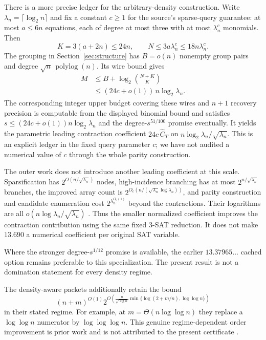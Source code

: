 There is a more precise ledger for the arbitrary-density construction.
Write $\lambda_n=\lceil\log_2n\rceil$ and fix a constant $c\ge1$ for the
source's sparse-query guarantee: at most $a\le6n$ equations, each of
degree at most three with at most $\lambda_n^c$ monomials. Then
\[
 K=3(a+2n)\le24n,\qquad N\le3a\lambda_n^c\le18n\lambda_n^c.
\]
The grouping in Section~\ref{sec:structure} has $B=o(n)$ nonempty group
pairs and degree $\sqrt n\,\operatorname{polylog}(n)$. Its wire bound gives
\begin{align*}
 M&\le B+\log_2\binom{N+K}{K}\\
  &\le (24c+o(1))\,n\log_2\lambda_n.
\end{align*}
The corresponding integer upper budget covering these wires and $n+1$
recovery precision is computable from the displayed binomial bound and
satisfies $s\le(24c+o(1))n\log_2\lambda_n$ and the degree-$s^{51/100}$
promise eventually. It yields the parametric leading contraction
coefficient $24c\,\widehat C_T$ on
$n\log_2\lambda_n/\sqrt{\lambda_n}$.
This is an explicit ledger in the fixed query parameter $c$; we have not
audited a numerical value of $c$ through the whole parity construction.

The outer work does not introduce another leading coefficient at this
scale. Sparsification has $2^{O(n/\sqrt{\lambda_n})}$ nodes,
high-incidence branching has at most $2^{n/\sqrt{\lambda_n}}$ branches,
the improved array count is
$2^{O_c(n/(\sqrt{\lambda_n}\log\lambda_n))}$, and parity construction
and candidate enumeration cost $2^{\lambda_n^{O_c(1)}}$ beyond the
contractions. Their logarithms are all
$o(n\log\lambda_n/\sqrt{\lambda_n})$ \cite{openai}.
Thus the smaller normalized coefficient improves the contraction
contribution using the same fixed 3-SAT reduction. It does not make
$13.690$ a numerical coefficient per original SAT variable.

Where the stronger degree-$s^{1/12}$ promise is available, the earlier
$13.37965\ldots$ cached option remains preferable to this specialization.
The present result is not a domination statement for every density regime.

The density-aware packets additionally retain the bound
\[
 (n+m)^{O(1)}
 2^{O\left(\frac n{\sqrt{\log n}}
       \min\{\log(2+m/n),\log\log n\}\right)}
\]
in their stated regime. For example, at $m=\Theta(n\log\log n)$ they
replace a $\log\log n$ numerator by $\log\log\log n$. This genuine
regime-dependent order improvement is prior work and is not attributed to
the present certificate \cite{density,density2}.

